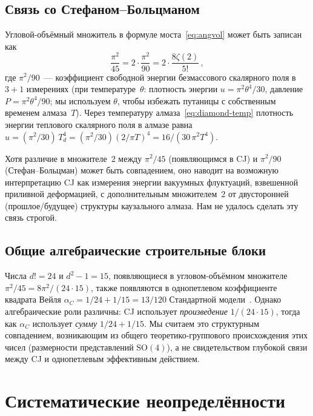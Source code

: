 \documentclass[12pt,a4paper]{article}
\theoremstyle{plain}
\theoremstyle{definition}
\theoremstyle{remark}
\begin{document}
\subsection{Связь со Стефаном--Больцманом}

Угловой-объёмный множитель в формуле
моста~\eqref{eq:angvol} может быть записан как
\begin{equation}\label{eq:sb-connection}
  \frac{\pi^2}{45} = 2 \cdot \frac{\pi^2}{90}
  = 2 \cdot \frac{8\zeta(2)}{5!}\,,
\end{equation}
где $\pi^2/90$~--- коэффициент свободной энергии
безмассового скалярного поля в $3{+}1$ измерениях (при
температуре~$\theta$: плотность энергии
$u = \pi^2\theta^4/30$, давление
$P = \pi^2\theta^4/90$; мы используем $\theta$, чтобы
избежать путаницы с собственным временем алмаза~$T$).
Через температуру алмаза~\eqref{eq:diamond-temp} плотность
энергии теплового скалярного поля в алмазе равна
$u = (\pi^2/30)\, T_d^4 = (\pi^2/30)(2/\pi T)^4
= 16/(30\, \pi^2 T^4)$.

Хотя различие в множителе~$2$ между $\pi^2/45$ (появляющимся
в CJ) и $\pi^2/90$ (Стефан--Больцман) может быть
совпадением, оно наводит на возможную интерпретацию CJ как
измерения энергии вакуумных флуктуаций, взвешенной приливной
деформацией, с дополнительным множителем~$2$ от двусторонней
(прошлое/будущее) структуры каузального алмаза.  Нам не
удалось сделать эту связь строгой.

\subsection{Общие алгебраические строительные блоки}

Числа $d! = 24$ и $d^2 - 1 = 15$, появляющиеся в
угловом-объёмном множителе
$\pi^2/45 = 8\pi^2/(24 \cdot 15)$, также появляются в
однопетлевом коэффициенте квадрата Вейля
$\alpha_C = 1/24 + 1/15 = 13/120$ Стандартной
модели~\cite{Alfyorov:2026ff}.  Однако алгебраические роли
различны: CJ использует \emph{произведение}
$1/(24 \cdot 15)$, тогда как $\alpha_C$ использует
\emph{сумму} $1/24 + 1/15$.  Мы считаем это структурным
совпадением, возникающим из общего теоретико-группового
происхождения этих чисел (размерности представлений
$\mathrm{SO}(4)$), а не свидетельством глубокой связи между
CJ и однопетлевым эффективным действием.

\section{Систематические неопределённости}
\label{sec:systematics}
\end{document}
